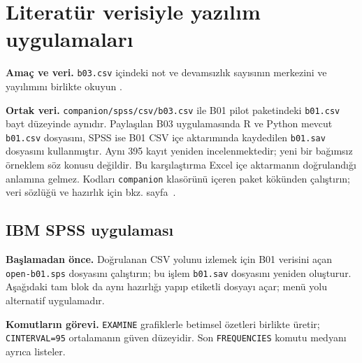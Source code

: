\section{Literatür verisiyle yazılım uygulamaları}
\label{sec:spss-b03}

\textbf{Amaç ve veri.} \texttt{b03.csv} içindeki not ve devamsızlık
sayısının merkezini ve yayılımını birlikte okuyun \citep{cortez2008data}.


\textbf{Ortak veri.} \nolinkurl{companion/spss/csv/b03.csv} ile B01
pilot paketindeki \texttt{b01.csv} bayt düzeyinde aynıdır. Paylaşılan
B03 uygulamasında R ve Python mevcut \texttt{b01.csv} dosyasını, SPSS
ise B01 CSV içe aktarımında kaydedilen \texttt{b01.sav} dosyasını
kullanmıştır. Aynı 395 kayıt yeniden incelenmektedir; yeni bir bağımsız
örneklem söz konusu değildir. Bu karşılaştırma Excel içe aktarmanın
doğrulandığı anlamına gelmez. Kodları \texttt{companion} klasörünü
içeren paket kökünden çalıştırın; veri sözlüğü ve hazırlık için bkz.
sayfa~\pageref{sec:spss-guide}.

\subsection{IBM SPSS uygulaması}
\textbf{Başlamadan önce.} Doğrulanan CSV yolunu izlemek için B01
verisini açan \texttt{open-b01.sps} dosyasını çalıştırın; bu işlem
\texttt{b01.sav} dosyasını yeniden oluşturur. Aşağıdaki tam blok da
aynı hazırlığı yapıp etiketli dosyayı açar; menü yolu alternatif uygulamadır.

\begin{spssadimlar}
\end{spssadimlar}

{\raggedright
\noindent\textbf{Komutların görevi.} \texttt{EXAMINE} grafiklerle betimsel özetleri birlikte üretir; \texttt{CINTERVAL=95} ortalamanın güven düzeyidir. Son \texttt{FREQUENCIES} komutu medyanı ayrıca listeler.\par}

